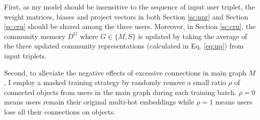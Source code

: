 First, as my model should be insensitive to the sequence of input user triplet, the weight matrices, biases and project vectors in both Section \ref{sc:upr} and Section \ref{sc:cru} should be shared among the three users. Moreover, in  Section \ref{sc:cru}, the community memory $D^G$ where $G \in \{M,S\}$ is updated by taking the average of the three updated community representations (calculated in Eq. \ref{eq:up}) from input triplets.

Second, to alleviate the negative effects of excessive connections in main graph $M$, I employ a masked training strategy by randomly remove a small ratio $\rho$ of connected objects from users in the main graph during each training batch. $\rho = 0$ means users remain their original multi-hot embeddings while $\rho = 1$ means users lose all their connections on objects. 




